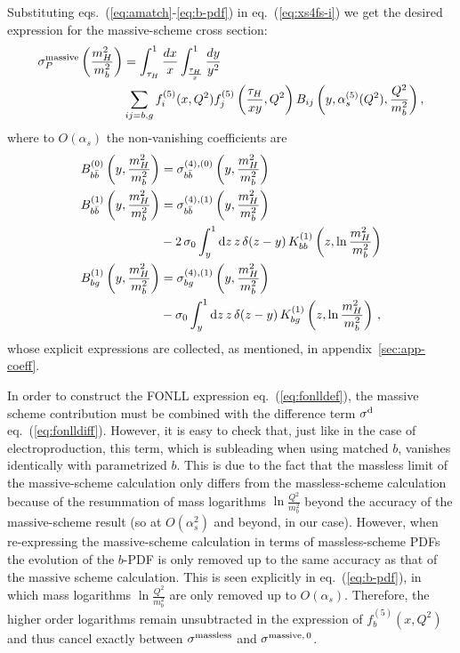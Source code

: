 Substituting eqs.~(\ref{eq:amatch}-\ref{eq:b-pdf}) in
eq.~(\ref{eq:xs4fs-i}) we get the desired expression for the
massive-scheme cross section:
\begin{equation}
  \label{massive:1}
  \begin{split}
  \sigma_P^{\rm
    massive}\left(\frac{m_H^2}{m_b^2}\right)&=
  \int_{\tau_H}^{1} \frac{dx}{x}\int_{\frac{\tau_H}{x}}^{1}
  \frac{dy}{y^2} \\
  &\sum_{ij=b,g}f_{i}^{(5)}(x,Q^2)f_j^{(5)}
  \left(\frac{\tau_H}{x y},Q^2\right)
  B_{ij}\left(y,\alpha_s^{(5)}(Q^2),
    \frac{Q^2}{m_b^2}\right),
  \end{split}
\end{equation}
where to $O(\alpha_s)$ the non-vanishing coefficients are 
\begin{align}
  \label{eq:change-of-scheme}
  B_{b\bar{b}}^{(0)}\left(y,\frac{m_H^2}{m_b^2}\right)  
    & = \sigma_{b\bar{b}}^{(4),(0)}\left(y,\frac{m_H^2}{m_b^2}\right) \\
  B_{b\bar{b}}^{(1)}\left(y,\frac{m_H^2}{m_b^2}\right)
    & = \sigma_{b\bar{b}}^{(4),(1)}\left(y,\frac{m_H^2}{m_b^2}\right) \nonumber\\ 
    & - 2\,\sigma_0
      \int_{y}^{1}{\rm d} z \,z\,\delta(z-y)\,
      K_{bb}^{(1)}\left(z,\ln\frac{m_H^2}{m_b^2}\right)\\
  B_{bg}^{(1)}\left(y,\frac{m_H^2}{m_b^2}\right)
    & = \sigma_{bg}^{(4),(1)}\left(y,\frac{m_H^2}{m_b^2}\right) \nonumber \\
    &  -\sigma_0
      \int_{y}^{1}{\rm d} z \,z\,\delta(z-y)\,
      K_{bg}^{(1)}\left(z,\ln\frac{m_H^2}{m_b^2}\right)\,,
\end{align}
whose explicit expressions are collected, as mentioned, in appendix~\ref{sec:app-coeff}.

In order to construct the FONLL expression eq.~(\ref{eq:fonlldef}), the
massive scheme contribution must be combined with the difference term
$\sigma ^{\rm d}$ eq.~(\ref{eq:fonlldiff}). However, it is easy to
check that, just like in the case of
electroproduction\cite{Ball:2015tna,Ball:2015dpa},
this term, which is subleading when using matched $b$, vanishes
identically with parametrized $b$. This is due to the
fact that the massless limit of the massive-scheme calculation only
differs from the massless-scheme calculation because of the resummation
of mass logarithms $\ln\frac{Q^2}{m_b^2}$ beyond the accuracy of the
massive-scheme result (so at $O(\alpha_s^2)$ and beyond, in our
case). However, when re-expressing the massive-scheme calculation in
terms of massless-scheme PDFs the evolution of the $b$-PDF is only
removed up to the same accuracy as that of the massive scheme
calculation. This is seen explicitly in eq.~(\ref{eq:b-pdf}), in which
mass logarithms  $\ln\frac{Q^2}{m_b^2}$ are only removed up to
$O(\alpha_s)$. Therefore, the higher order logarithms remain unsubtracted in
the expression of $f_b^{(5)} (x,Q^2)$ and thus cancel exactly between
$\sigma^{\rm massless}$ and $\sigma^{\rm massive,\,0}$.

